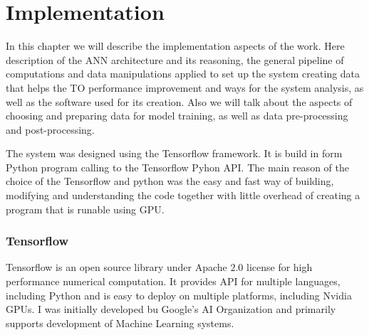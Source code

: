 
\chapter{Implementation}

In this chapter we will describe the implementation aspects of the work.
Here description of the ANN architecture and its reasoning, the general pipeline of computations and data manipulations applied to set up the system creating data that helps the TO performance improvement and ways for the system analysis, as well as the software used for its creation.
Also we will talk about the aspects of choosing and preparing data for model training, as well as data pre-processing and post-processing.
\medskip


The system was designed using the Tensorflow framework. 
It is build in form Python program calling to the Tensorflow Pyhon API.
The main reason of the choice of the Tensorflow and python was the easy and fast way of building, modifying and understanding the code together with little overhead of
creating a program that is runable using GPU. 
\medskip


\subsection{Tensorflow}

Tensorflow is an open source library under Apache $2.0$ license for high performance numerical computation\cite{tensorflow_main}.
It provides API for multiple languages, including Python and is easy to deploy on multiple platforms, including Nvidia GPUs.
I was initially developed bu Google's AI Organization and primarily supports development of Machine Learning systems.
\medskip

